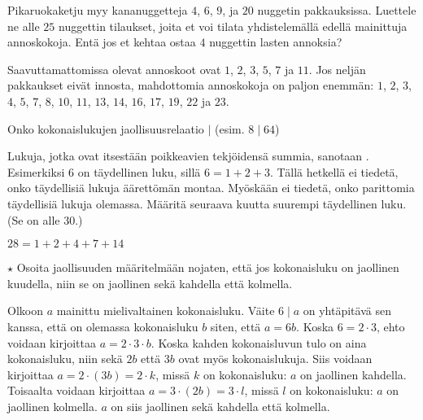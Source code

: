 \begin{tehtavasivu}
\begin{tehtava}
Pikaruokaketju myy kananuggetteja $4$, $6$, $9$, ja $20$ nuggetin pakkauksissa. Luettele ne alle $25$ nuggettin tilaukset, joita et voi tilata yhdistelemällä edellä mainittuja annoskokoja. Entä jos et kehtaa ostaa $4$ nuggettin lasten annoksia?
	\begin{vastaus}
		Saavuttamattomissa olevat annoskoot ovat $1$, $2$, $3$, $5$, $7$ ja $11$. Jos neljän pakkaukset eivät innosta, mahdottomia annoskokoja on paljon enemmän: $1$, $2$, $3$, $4$, $5$, $7$, $8$, $10$, $11$, $13$, $14$, $16$, $17$, $19$, $22$ ja $23$.
	\end{vastaus}
\end{tehtava}

\begin{tehtava}
Onko kokonaislukujen jaollisuusrelaatio $\mid$ (esim. $8\mid 64$)
	\begin{vastaus}
	\end{vastaus}
\end{tehtava}

\begin{tehtava}
Lukuja, jotka ovat itsestään poikkeavien tekjöidensä summia, sanotaan . Esimerkiksi $6$ on täydellinen luku, sillä $6=1+2+3$. Tällä hetkellä ei tiedetä, onko täydellisiä lukuja äärettömän montaa. Myöskään ei tiedetä, onko parittomia täydellisiä lukuja olemassa.
Määritä seuraava kuutta suurempi täydellinen luku. (Se on alle $30$.)
	\begin{vastaus}
$28=1+2+4+7+14$
	\end{vastaus}
\end{tehtava}

\begin{tehtava} %
$\star$ Osoita jaollisuuden määritelmään nojaten, että jos kokonaisluku on jaollinen kuudella, niin se on jaollinen sekä kahdella että kolmella.
	\begin{vastaus}
	Olkoon $a$ mainittu mielivaltainen kokonaisluku. Väite $6\mid a$ on yhtäpitävä sen kanssa, että on olemassa kokonaisluku $b$ siten, että $a=6b$. Koska $6=2\cdot3$, ehto voidaan kirjoittaa $a=2\cdot3\cdot b$. Koska kahden kokonaisluvun tulo on aina kokonaisluku, niin sekä $2b$ että $3b$ ovat myös kokonaislukuja. Siis voidaan kirjoittaa $a=2\cdot (3b)=2\cdot k$, missä $k$ on kokonaisluku: $a$ on jaollinen kahdella. Toisaalta voidaan kirjoittaa $a=3\cdot (2b)=3\cdot l$, missä $l$ on kokonaisluku: $a$ on jaollinen kolmella. $a$ on siis jaollinen sekä kahdella että kolmella. 
	\end{vastaus}
\end{tehtava}

\end{tehtavasivu}